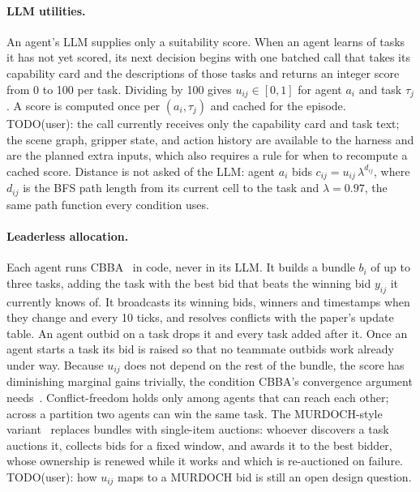\documentclass[letterpaper]{article}
\begin{document}
\paragraph{LLM utilities.}
An agent's LLM supplies only a suitability score. When an agent learns of tasks it has not yet scored, its next decision begins with one batched call that takes its capability card and the descriptions of those tasks and returns an integer score from 0 to 100 per task. Dividing by 100 gives $u_{ij}\in[0,1]$ for agent $a_i$ and task $\tau_j$. A score is computed once per $(a_i,\tau_j)$ and cached for the episode. TODO(user): the call currently receives only the capability card and task text; the scene graph, gripper state, and action history are available to the harness and are the planned extra inputs, which also requires a rule for when to recompute a cached score. Distance is not asked of the LLM: agent $a_i$ bids $c_{ij}=u_{ij}\,\lambda^{d_{ij}}$, where $d_{ij}$ is the BFS path length from its current cell to the task and $\lambda=0.97$, the same path function every condition uses.

\paragraph{Leaderless allocation.}
Each agent runs CBBA~\citep{choi2009cbba} in code, never in its LLM. It builds a bundle $b_i$ of up to three tasks, adding the task with the best bid that beats the winning bid $y_{ij}$ it currently knows of. It broadcasts its winning bids, winners and timestamps when they change and every 10 ticks, and resolves conflicts with the paper's update table. An agent outbid on a task drops it and every task added after it. Once an agent starts a task its bid is raised so that no teammate outbids work already under way. Because $u_{ij}$ does not depend on the rest of the bundle, the score has diminishing marginal gains trivially, the condition CBBA's convergence argument needs~\citep{choi2009cbba}. Conflict-freedom holds only among agents that can reach each other; across a partition two agents can win the same task. The MURDOCH-style variant~\citep{gerkey2002sold} replaces bundles with single-item auctions: whoever discovers a task auctions it, collects bids for a fixed window, and awards it to the best bidder, whose ownership is renewed while it works and which is re-auctioned on failure. TODO(user): how $u_{ij}$ maps to a MURDOCH bid is still an open design question.
\end{document}
